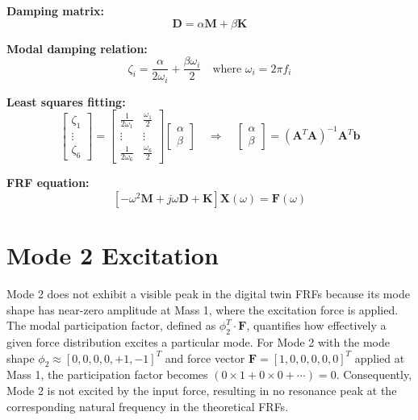 \documentclass[11pt,a4paper]{article}
\begin{document}
\textbf{Damping matrix:}
\begin{equation}
\boxed{\mathbf{D} = \alpha \mathbf{M} + \beta \mathbf{K}}
\end{equation}

\textbf{Modal damping relation:}
\begin{equation}
\boxed{\zeta_i = \frac{\alpha}{2\omega_i} + \frac{\beta \omega_i}{2}} \quad \text{where } \omega_i = 2\pi f_i
\end{equation}

\textbf{Least squares fitting:}
\begin{equation}
\begin{bmatrix}
\zeta_1 \\ \vdots \\ \zeta_6
\end{bmatrix}
=
\begin{bmatrix}
\frac{1}{2\omega_1} & \frac{\omega_1}{2} \\
\vdots & \vdots \\
\frac{1}{2\omega_6} & \frac{\omega_6}{2}
\end{bmatrix}
\begin{bmatrix}
\alpha \\ \beta
\end{bmatrix}
\quad \Rightarrow \quad
\boxed{\begin{bmatrix}
\alpha \\ \beta
\end{bmatrix} = (\mathbf{A}^T\mathbf{A})^{-1} \mathbf{A}^T \mathbf{b}}
\end{equation}

\textbf{FRF equation:}
\begin{equation}
\left[-\omega^2 \mathbf{M} + j\omega\mathbf{D} + \mathbf{K}\right] \mathbf{X}(\omega) = \mathbf{F}(\omega)
\end{equation}

\section{Mode 2 Excitation}

Mode 2 does not exhibit a visible peak in the digital twin FRFs because its mode shape has near-zero amplitude at Mass 1, where the excitation force is applied. The modal participation factor, defined as $\phi_2^T \cdot \mathbf{F}$, quantifies how effectively a given force distribution excites a particular mode. For Mode 2 with the mode shape $\phi_2 \approx [0, 0, 0, 0, +1, -1]^T$ and force vector $\mathbf{F} = [1, 0, 0, 0, 0, 0]^T$ applied at Mass 1, the participation factor becomes $(0 \times 1 + 0 \times 0 + \cdots) = 0$. Consequently, Mode 2 is not excited by the input force, resulting in no resonance peak at the corresponding natural frequency in the theoretical FRFs.
\end{document}
